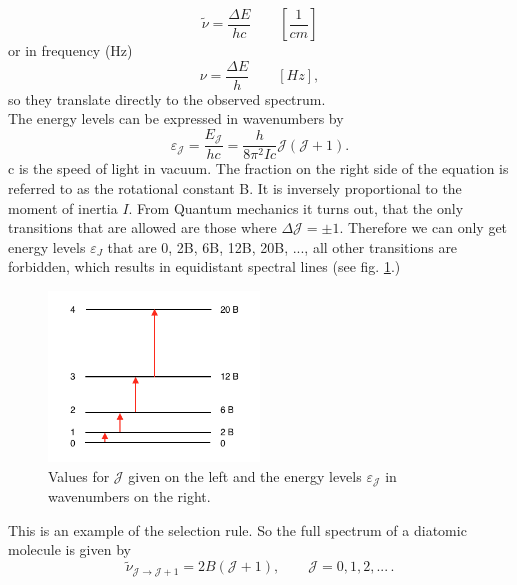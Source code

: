 \documentclass[a4paper,fleqn]{article}
\renewcommand{\epsilon}{\varepsilon}  %
\begin{document}
\begin{equation}
\tilde{\nu} = \frac{\Delta E}{hc} \qquad \left[\frac{1}{cm}\right]
\end{equation}
or in frequency (Hz)
\begin{equation}
\nu = \frac{\Delta E}{h} \qquad \left[Hz\right],
\end{equation}
so they translate directly to the observed spectrum.\\
The energy levels can be expressed in wavenumbers by
\begin{equation}
\epsilon_\mathcal{J} = \frac{E_\mathcal{J}}{hc} = \frac{h}{8 \pi^2 I c} \mathcal{J}(\mathcal{J}+1).
\end{equation}
c is the speed of light in vacuum. The fraction on the right side of the equation is referred to as the rotational constant B. It is inversely proportional to the moment of inertia $I$. From Quantum mechanics it turns out, that the only transitions that are allowed are those where $\Delta \mathcal{J} = \pm1$. Therefore we can only get energy levels $\epsilon_J$ that are 0, 2B, 6B, 12B, 20B, ..., all other transitions are forbidden, which results in equidistant spectral lines (see fig. \ref{Energy_levels}.) \\

\begin{figure}[htbp]
\begin{center}
\includegraphics[width=0.5\textwidth]{figures/Energy_levels}
\caption{Values for $\mathcal{J}$ given on the left and the energy levels $\epsilon_{\mathcal{J}}$ in wavenumbers on the right.}
\label{Energy_levels}
\end{center}
\end{figure}

This is an example of the selection rule. So the full spectrum of a diatomic molecule is given by
\begin{equation}
\tilde{\nu}_{\mathcal{J}\rightarrow \mathcal{J}+1} = 2B(\mathcal{J}+1), \qquad \mathcal{J} = 0, 1, 2, ...\,.
\end{equation}
\end{document}
